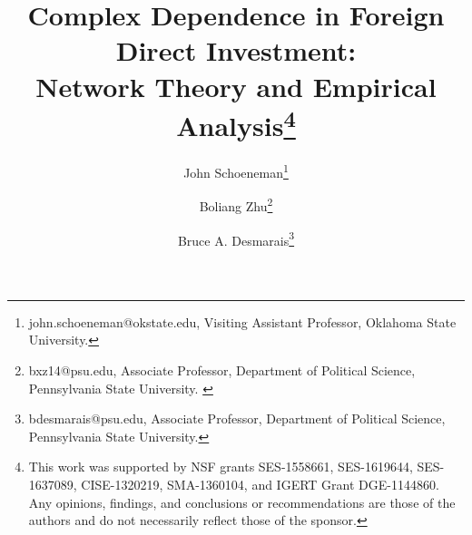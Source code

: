 \documentclass[reqno,onecolumn,letterpaper,12pt]{article}
\begin{document}
\title{Complex Dependence in Foreign Direct Investment: \\Network Theory and Empirical Analysis\footnote{This work was supported by NSF grants SES-1558661, SES-1619644,
 SES-1637089, CISE-1320219, SMA-1360104, and IGERT Grant DGE-1144860. Any opinions, findings, and conclusions or recommendations are those of the authors and
 do not necessarily reflect those of the sponsor.}}
\author{John  Schoeneman\thanks{\footnotesize{
john.schoeneman@okstate.edu, Visiting Assistant Professor, Oklahoma State University.}} \and Boliang Zhu\thanks{\footnotesize{bxz14@psu.edu, Associate Professor, Department of Political
Science, Pennsylvania State University. }} \and Bruce A. Desmarais\thanks{\footnotesize{
bdesmarais@psu.edu, Associate Professor, Department of Political Science, Pennsylvania State University.}}}
\date{}
\maketitle
\end{document}
